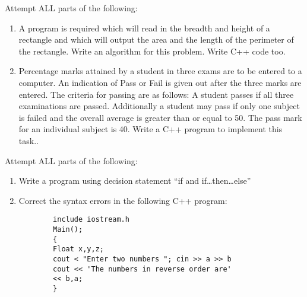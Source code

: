 \documentclass[11pt]{article}
\begin{document}
\begin{questions}
\question Attempt ALL parts of the following: 
\begin{enumerate}
\item A program is required which will read in the breadth and height of a
rectangle and which will output the area and the length of the perimeter of the rectangle. Write an algorithm for this problem.
Write C++ code too.
\item   Percentage marks attained by a student in three exams are to be entered to a computer. An indication of Pass or Fail is given out after
the three marks are entered. The criteria for passing are as follows:
A student passes if all three examinations are passed. Additionally a
student may pass if only one subject is failed and the overall average
is greater than or equal to 50. The pass mark for an individual subject
is 40.
Write a C++ program to implement this task..                                          
\end{enumerate}
\vspace{-0.2cm}

\question Attempt ALL parts of the following: 
\begin{enumerate}
\item Write a program using  decision statement “if and if…then…else”  \item 
        Correct the syntax errors in the following C++ program:
        \begin{verbatim}
        include iostream.h
        Main();
        {
        Float x,y,z;
        cout < "Enter two numbers "; cin >> a >> b
        cout << 'The numbers in reverse order are'
        << b,a;
        }
        \end{verbatim}
\end{enumerate}
\vspace{-0.2cm}
\end{questions}
\end{document}
